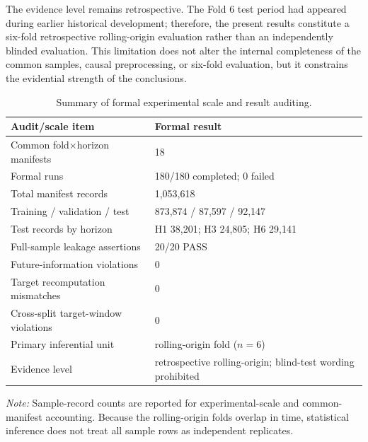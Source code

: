 \documentclass[pdflatex,sn-mathphys-num,iicol]{sn-jnl}
\begin{document}
The evidence level remains retrospective. The Fold 6 test period had appeared during earlier historical development; therefore, the present results constitute a six-fold retrospective rolling-origin evaluation rather than an independently blinded evaluation. This limitation does not alter the internal completeness of the common samples, causal preprocessing, or six-fold evaluation, but it constrains the evidential strength of the conclusions.



\begin{table}[!t]
\caption{Summary of formal experimental scale and result auditing.}
\label{tab:experiment-audit}
\centering

\renewcommand{\arraystretch}{1.15}
\begin{tabular}{
|p{}
|p{}|
}
\hline

\textbf{Audit/scale item}
&
\textbf{Formal result}
\\
\hline

Common fold$\times$horizon manifests
&
18
\\
\hline

Formal runs
&
180/180 completed; 0 failed
\\
\hline

Total manifest records
&
1,053,618
\\
\hline

Training / validation / test
&
873,874 / 87,597 / 92,147
\\
\hline

Test records by horizon
&
H1 38,201; H3 24,805; H6 29,141
\\
\hline

Full-sample leakage assertions
&
20/20 PASS
\\
\hline

Future-information violations
&
0
\\
\hline

Target recomputation mismatches
&
0
\\
\hline

Cross-split target-window violations
&
0
\\
\hline

Primary inferential unit
&
rolling-origin fold ($n=6$)
\\
\hline

Evidence level
&
retrospective rolling-origin; blind-test wording prohibited
\\
\hline

\end{tabular}

\vspace{2mm}

\begin{flushleft}
\footnotesize
\textit{Note:} Sample-record counts are reported for experimental-scale and common-manifest accounting. Because the rolling-origin folds overlap in time, statistical inference does not treat all sample rows as independent replicates.
\end{flushleft}

\end{table}
\end{document}

